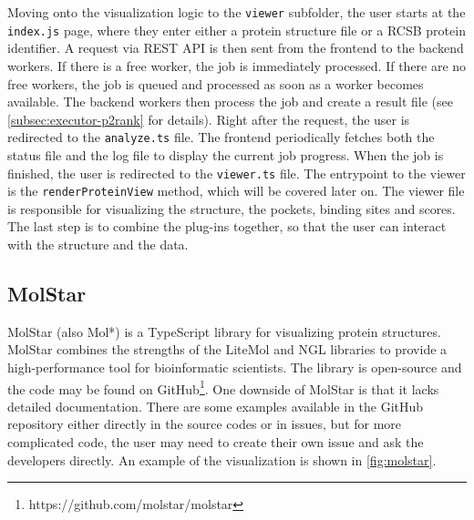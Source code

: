 Moving onto the visualization logic to the \texttt{viewer} subfolder, the user starts at the \texttt{index.js} page, where they enter either a protein structure file or a RCSB protein identifier. A request via REST API is then sent from the frontend to the backend workers. If there is a free worker, the job is immediately processed. If there are no free workers, the job is queued and processed as soon as a worker becomes available. The backend workers then process the job and create a result file (see \cref{subsec:executor-p2rank} for details). Right after the request, the user is redirected to the \texttt{analyze.ts} file. The frontend periodically fetches both the status file and the log file to display the current job progress. When the job is finished, the user is redirected to the \texttt{viewer.ts} file. The entrypoint to the viewer is the \texttt{renderProteinView} method, which will be covered later on. The viewer file is responsible for visualizing the structure, the pockets, binding sites and scores. The last step is to combine the plug-ins together, so that the user can interact with the structure and the data.

\subsection{MolStar}
\label{subsec:frontend-molstar}

MolStar (also Mol*) is a TypeScript library for visualizing protein structures. MolStar combines the strengths of the LiteMol and NGL libraries to provide a high-performance tool for bioinformatic scientists. The library is open-source and the code may be found on GitHub\footnote{https://github.com/molstar/molstar}. One downside of MolStar is that it lacks detailed documentation. There are some examples available in the GitHub repository either directly in the source codes or in issues, but for more complicated code, the user may need to create their own issue and ask the developers directly. An example of the visualization is shown in \cref{fig:molstar}.

